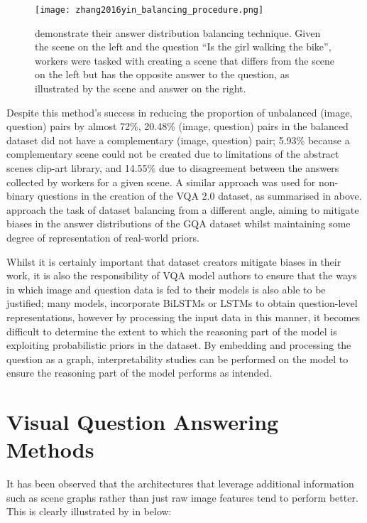 \begin{figure}[H]
    \centering
    \texttt{[image: zhang2016yin\_balancing\_procedure.png]}
    \caption{\citeauthor{zhang2016yin} demonstrate their answer distribution balancing technique. Given the scene on the left and the question ``Is the girl walking the bike'', workers were tasked with creating a scene that differs from the scene on the left but has the opposite answer to the question, as illustrated by the scene and answer on the right.}
    \label{fig:zhang2016yin_balancing_procedure}
\end{figure}

Despite this method's success in reducing the proportion of unbalanced (image, question) pairs by almost 72\%, 20.48\% (image, question) pairs in the balanced dataset did not have a complementary (image, question) pair; 5.93\% because a complementary scene could not be created due to limitations of the abstract scenes clip-art library, and 14.55\% due to disagreement between the answers collected by workers for a given scene. A similar approach was used for non-binary questions in the creation of the VQA 2.0 dataset, as summarised in \tableautorefname{  \ref{tab:dataset_comparison}} above. \citeauthor{hudson2019gqa} approach the task of dataset balancing from a different angle, aiming to mitigate biases in the answer distributions of the GQA dataset whilst maintaining some degree of representation of real-world priors.

Whilst it is certainly important that dataset creators mitigate biases in their work, it is also the responsibility of VQA model authors to ensure that the ways in which image and question data is fed to their models is also able to be justified; many models,  incorporate BiLSTMs \cite{hudson2018compositional} or LSTMs \cite{andreas2016neural} to obtain question-level representations, however by processing the input data in this manner, it becomes difficult to determine the extent to which the reasoning part of the model is exploiting probabilistic priors in the dataset. By embedding and processing the question as a graph, interpretability studies can be performed on the model to ensure the reasoning part of the model performs as intended.

\section{Visual Question Answering Methods}
\label{section:vqa_methods}

It has been observed that the architectures that leverage additional information such as scene graphs rather than just raw image features tend to perform better. This is clearly illustrated by \citeauthor{hudson2019gqa_preprint} in \figureautorefname{ \ref{fig:gqa_input_representation}} below:

